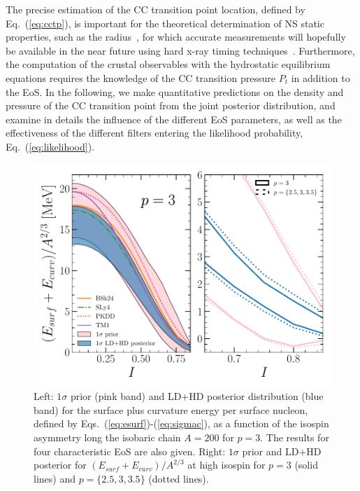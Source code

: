 The precise estimation of the CC transition point location, defined by
Eq.~(\ref{eq:cctp}), is important for the theoretical determination of NS 
static properties, such as the radius~\cite{Fortin2016}, for which accurate 
measurements will hopefully be available in the near future using hard x-ray 
timing techniques~\cite{Watts2016}. 
Furthermore, the computation of the crustal observables with the hydrostatic 
equilibrium equations requires the knowledge of the CC transition pressure 
$P_t$ in addition to the EoS. 
In the following, we make quantitative predictions on the density and
pressure of the CC transition point from the joint posterior distribution, and 
examine in details the influence of the different EoS parameters, as well as 
the effectiveness of the different filters entering the likelihood 
probability, Eq.~(\ref{eq:likelihood}).

\begin{figure}[!t]
  \begin{center}
    \includegraphics[width=0.9\linewidth]{figures/surf_bayes.pdf}
  \end{center}
  \caption[Prior and posterior distribution for the surface plus curvature
  energy per surface nucleon versus isospin asymmetry]{Left: $1\sigma$ prior
    (pink band) and LD+HD posterior distribution (blue band) for the surface 
    plus curvature energy per surface nucleon, defined by 
    Eqs.~(\ref{eq:esurf})-(\ref{eq:sigmac}), as a 
    function of the isospin asymmetry long the isobaric chain $A=200$ for
    $p=3$. The results for four characteristic EoS are also given. 
    Right: $1\sigma$ prior and LD+HD posterior for 
    $(E_{surf} + E_{curv})/A^{2/3}$ at high isospin for $p=3$ (solid lines) and 
  $p=\{2.5,3,3.5\}$ (dotted lines).}\label{fig:surf_bayes}
\end{figure}

